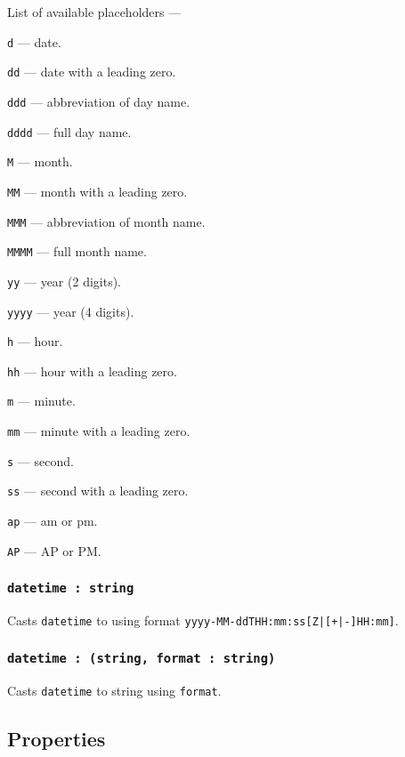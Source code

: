 List of available placeholders —
\begin{icItems}
	\item \texttt{d} — date.
	\item \texttt{dd} — date with a leading zero.
	\item \texttt{ddd} — abbreviation of day name.
	\item \texttt{dddd} — full day name.
	\item \texttt{M} — month.
	\item \texttt{MM} — month with a leading zero.
	\item \texttt{MMM} — abbreviation of month name.
	\item \texttt{MMMM} — full month name.
	\item \texttt{yy} — year (2 digits).
	\item \texttt{yyyy} — year (4 digits).
	\item \texttt{h} — hour.
	\item \texttt{hh} — hour with a leading zero.
	\item \texttt{m} — minute.
	\item \texttt{mm} — minute with a leading zero.
	\item \texttt{s} — second.
	\item \texttt{ss} — second with a leading zero.
	\item \texttt{ap} — am or pm.
	\item \texttt{AP} — AP or PM.
\end{icItems}

\subsubsection{\texttt{datetime : string}}

Casts \texttt{datetime} to \str using format \texttt{yyyy-MM-ddTHH:mm:ss[Z|[+|-]HH:mm]}.

\subsubsection{\texttt{datetime : (string, format : string)}}

Casts \texttt{datetime} to string using \texttt{format}.

\subsection{Properties}

